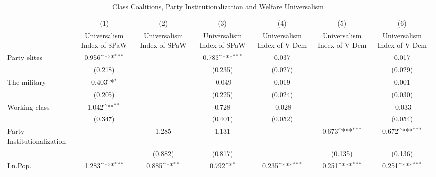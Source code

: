 \begin{table}[htbp]\centering
\def\sym#1{\ifmmode^{#1}\else\(^{#1}\)\fi}
\caption{Class Coalitions, Party Institutionalization and Welfare Universalism}
\begin{tabular}{l*{6}{c}}
\hline\hline
                    &\multicolumn{1}{c}{(1)}         &\multicolumn{1}{c}{(2)}         &\multicolumn{1}{c}{(3)}         &\multicolumn{1}{c}{(4)}         &\multicolumn{1}{c}{(5)}         &\multicolumn{1}{c}{(6)}         \\
                    &Universalism Index of SPaW         &Universalism Index of SPaW         &Universalism Index of SPaW         &Universalism Index of V-Dem         &Universalism Index of V-Dem         &Universalism Index of V-Dem         \\
\hline
Party elites        &       0.956\sym{***}&                     &       0.783\sym{***}&       0.037         &                     &       0.017         \\
                    &     (0.218)         &                     &     (0.235)         &     (0.027)         &                     &     (0.029)         \\
[1em]
The military        &       0.403\sym{*}  &                     &      -0.049         &       0.019         &                     &       0.001         \\
                    &     (0.205)         &                     &     (0.225)         &     (0.024)         &                     &     (0.030)         \\
[1em]
Working class       &       1.042\sym{**} &                     &       0.728         &      -0.028         &                     &      -0.033         \\
                    &     (0.347)         &                     &     (0.401)         &     (0.052)         &                     &     (0.054)         \\
[1em]
Party Institutionalization&                     &       1.285         &       1.131         &                     &       0.673\sym{***}&       0.672\sym{***}\\
                    &                     &     (0.882)         &     (0.817)         &                     &     (0.135)         &     (0.136)         \\
[1em]
Ln.Pop.             &       1.283\sym{***}&       0.885\sym{**} &       0.792\sym{*}  &       0.235\sym{***}&       0.251\sym{***}&       0.251\sym{***}\\

\end{tabular}
\end{table}
